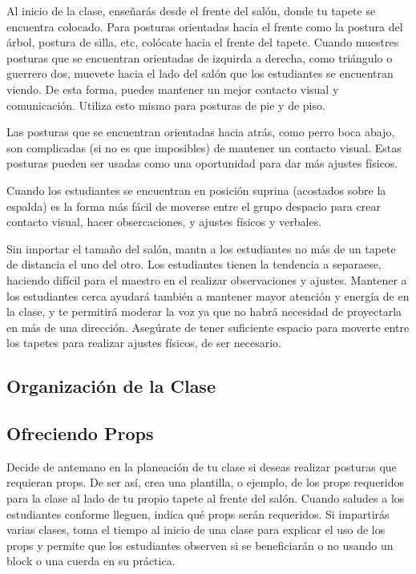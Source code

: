 Al inicio de la clase, enseñarás desde el frente del salón, donde tu tapete se encuentra colocado. Para posturas orientadas hacia el frente como la postura del árbol, postura de silla, etc, colócate hacia el frente del tapete. Cuando muestres posturas que se encuentran orientadas de izquirda a derecha, como triángulo o guerrero dos, muevete hacia el lado del salón que los estudiantes se encuentran viendo. De esta forma, puedes mantener un mejor contacto visual y comunicación. Utiliza esto mismo para posturas de pie y de piso.

Las posturas que se encuentran orientadas hacia atrás, como perro boca abajo, son complicadas (si no es que imposibles) de mantener un contacto visual. Estas posturas pueden ser usadas como una oportunidad para dar más ajustes físicos.

Cuando los estudiantes se encuentran en posición suprina (acostados sobre la espalda) es la forma más fácil de moverse entre el grupo despacio para crear contacto visual, hacer obsercaciones, y ajustes físicos y verbales.

Sin importar el tamaño del salón, mantn a los estudiantes no más de un tapete de distancia el uno del otro. Los estudiantes tienen la tendencia a separaese, haciendo difícil para el maestro en el realizar observaciones y ajustes. Mantener a los estudiantes cerca ayudará tambi\'en a mantener mayor atención y energía de en la clase, y te permitirá moderar la voz ya que no habrá necesidad de proyectarla en más de una dirección. Asegúrate de tener suficiente espacio para moverte entre los tapetes para realizar ajustes físicos, de ser necesario.

\subsection{Organización de la Clase}

\subsection{Ofreciendo Props}
Decide de antemano en la planeación de tu clase si deseas realizar posturas que requieran props. De ser así, crea una plantilla, o ejemplo, de los props requeridos para la clase al lado de tu propio tapete al frente del salón. Cuando saludes a los estudiantes conforme lleguen, indica qu\'e props serán requeridos. Si impartirás varias clases, toma el tiempo al inicio de una clase para explicar el uso de los props y permite que los estudiantes observen si se beneficiarán o no usando un block o una cuerda en su práctica.


